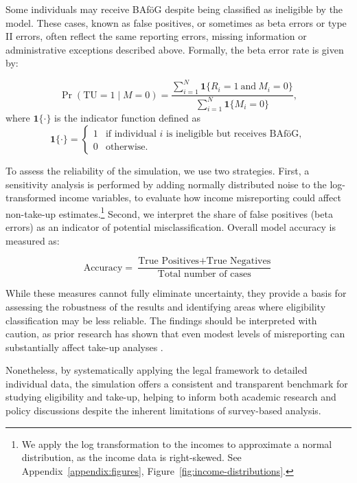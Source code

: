 Some individuals may receive BAföG despite being classified as ineligible by the model. These cases, known as false positives, or sometimes as beta errors or type II errors, often reflect the same reporting errors, missing information or administrative exceptions described above. Formally, the beta error rate is given by:

\begin{equation}
\Pr(\text{TU} = 1 \mid M = 0) = \frac{\sum_{i=1}^{N} \mathbf{1}\{R_i = 1 \ \text{and} \ M_i = 0\}}{\sum_{i=1}^{N} \mathbf{1}\{M_i = 0\}},
\end{equation}
where \( \mathbf{1}\{\cdot\} \) is the indicator function defined as
\[
\mathbf{1}\{\cdot\} =
\begin{cases}
1 & \text{if individual } i \text{ is ineligible but receives BAföG}, \\
0 & \text{otherwise}.
\end{cases}
\]

To assess the reliability of the simulation, we use two strategies. First, a sensitivity analysis is performed by adding normally distributed noise to the log-transformed income variables, to evaluate how income misreporting could affect non-take-up estimates.\footnote{
We apply the log transformation to the incomes to approximate a normal distribution, as the income data is right-skewed. See Appendix~\ref{appendix:figures}, Figure~\ref{fig:income-distributions}.
}
Second, we interpret the share of false positives (beta errors) as an indicator of potential misclassification. Overall model accuracy is measured as:

\begin{equation} \label{eq:accuracy_microsimulation}
	\text{Accuracy} = \frac{\text{True Positives} + \text{True Negatives}}{\text{Total number of cases}}
\end{equation}

While these measures cannot fully eliminate uncertainty, they provide a basis for assessing the robustness of the results and identifying areas where eligibility classification may be less reliable. The findings should be interpreted with caution, as prior research has shown that even modest levels of misreporting can substantially affect take-up analyses \citep{pudney_impact_2001}. 

Nonetheless, by systematically applying the legal framework to detailed individual data, the simulation offers a consistent and transparent benchmark for studying eligibility and take-up, helping to inform both academic research and policy discussions despite the inherent limitations of survey-based analysis.





